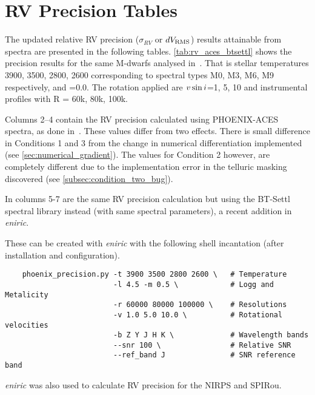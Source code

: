 
\chapter{RV Precision Tables} %

\label{app:nir_prec_amendment}

The updated relative RV precision ($\sigma_{RV}$ or $dV_{\textrm{RMS}}$) results attainable from \nir{} spectra are presented in the following tables.
\cref{tab:rv_aces_btsettl} shows the precision results for the same M-dwarfs analysed in~\citep{figueira_radial_2016}.
That is stellar temperatures 3900, 3500, 2800, 2600\K{} corresponding to spectral types M0, M3, M6, M9 respectively,  and \feh{}=0.0.
The rotation applied are $v\sin{i}{}$=1, 5, 10\kmps{} and instrumental profiles with R = 60k, 80k, 100k.

Columns 2--4 contain the RV precision calculated using {PHOENIX-ACES} spectra, as done in~\citet{figueira_radial_2016}.
These values differ from two effects.
There is small difference in Conditions 1 and 3 from the change in numerical differentiation implemented (see \cref{sec:numerical_gradient}).
The values for Condition 2 however, are completely different due to the implementation error in the telluric masking discovered (see \cref{subsec:condition_two_bug}).

In columns 5-7 are the same RV precision calculation but using the {BT-Settl} spectral library instead (with same spectral parameters), a recent addition in \emph{eniric}.


These can be created with \emph{eniric} with the following shell incantation (after installation and configuration).


\begin{lstlisting}
    phoenix_precision.py -t 3900 3500 2800 2600 \   # Temperature
                         -l 4.5 -m 0.5 \            # Logg and Metalicity
                         -r 60000 80000 100000 \    # Resolutions
                         -v 1.0 5.0 10.0 \          # Rotational velocities
                         -b Z Y J H K \             # Wavelength bands
                         --snr 100 \                # Relative SNR
                         --ref_band J               # SNR reference band
\end{lstlisting}


\emph{eniric} was also used to calculate {RV} precision for the {NIRPS} and {SPIRou}.

